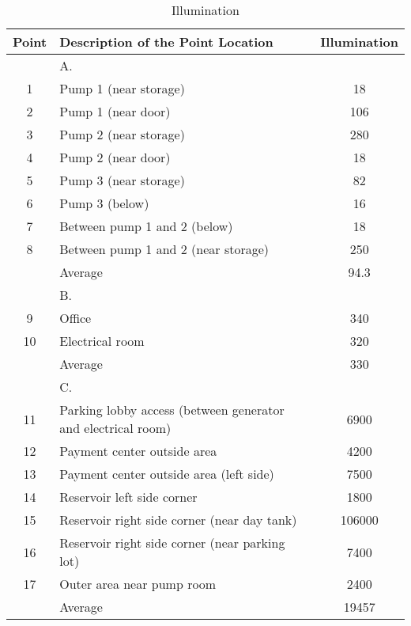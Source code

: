 \begin{table}
	\caption{Illumination}
	\label{ch047_tbl_illumination}
	{\footnotesize


\begin{tabular}{c|l|c}
\hline
Point & Description of the Point Location & Illumination \\ 
\hline
 & A. &  \\ 
1 & Pump 1  (near storage) & 18 \\ 
2 & Pump 1  (near door) & 106 \\ 
3 & Pump 2 (near storage) & 280 \\ 
4 & Pump 2  (near door) & 18 \\ 
5 & Pump 3  (near storage) & 82 \\ 
6 & Pump 3 (below) & 16 \\ 
7 & Between pump 1 and 2 (below) & 18 \\ 
8 & Between pump 1 and 2 (near storage) & 250 \\ 
 & Average & 94.3 \\ 
\hline
 & B. &  \\ 
9 & Office & 340 \\ 
10 & Electrical room & 320 \\ 
 & Average & 330 \\ 
\hline
 & C. &  \\ 
11 & Parking lobby access (between generator and electrical room) & 6900 \\ 
12 & Payment center outside area & 4200 \\ 
13 & Payment center outside area (left side) & 7500 \\ 
14 & Reservoir left side corner & 1800 \\ 
15 & Reservoir right side corner (near day tank) & 106000 \\ 
16 & Reservoir right side corner (near parking lot) & 7400 \\ 
17 & Outer area near pump room & 2400 \\ 
 & Average & 19457 \\ 
\hline
\end{tabular}
}
\end{table}